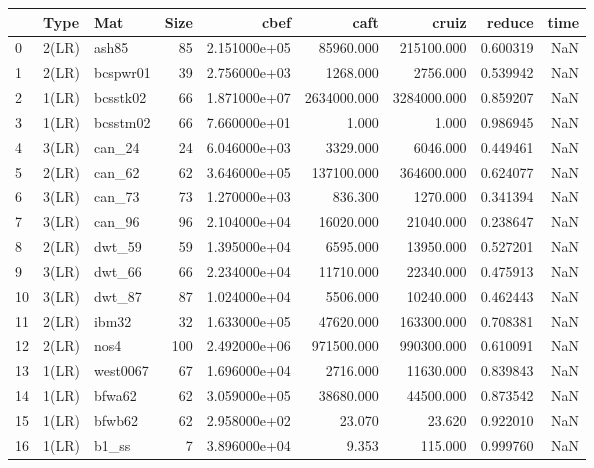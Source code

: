 \begin{tabular}{lllrrrrrr}
\toprule
{} &   Type &            Mat &  Size &          cbef &         caft &        cruiz &    reduce &  time \\
\midrule
0  &  2(LR) &          ash85 &    85 &  2.151000e+05 &    85960.000 &   215100.000 &  0.600319 &   NaN \\
1  &  2(LR) &       bcspwr01 &    39 &  2.756000e+03 &     1268.000 &     2756.000 &  0.539942 &   NaN \\
2  &  1(LR) &       bcsstk02 &    66 &  1.871000e+07 &  2634000.000 &  3284000.000 &  0.859207 &   NaN \\
3  &  1(LR) &       bcsstm02 &    66 &  7.660000e+01 &        1.000 &        1.000 &  0.986945 &   NaN \\
4  &  3(LR) &         can\_24 &    24 &  6.046000e+03 &     3329.000 &     6046.000 &  0.449461 &   NaN \\
5  &  2(LR) &         can\_62 &    62 &  3.646000e+05 &   137100.000 &   364600.000 &  0.624077 &   NaN \\
6  &  3(LR) &         can\_73 &    73 &  1.270000e+03 &      836.300 &     1270.000 &  0.341394 &   NaN \\
7  &  3(LR) &         can\_96 &    96 &  2.104000e+04 &    16020.000 &    21040.000 &  0.238647 &   NaN \\
8  &  2(LR) &         dwt\_59 &    59 &  1.395000e+04 &     6595.000 &    13950.000 &  0.527201 &   NaN \\
9  &  3(LR) &         dwt\_66 &    66 &  2.234000e+04 &    11710.000 &    22340.000 &  0.475913 &   NaN \\
10 &  3(LR) &         dwt\_87 &    87 &  1.024000e+04 &     5506.000 &    10240.000 &  0.462443 &   NaN \\
11 &  2(LR) &          ibm32 &    32 &  1.633000e+05 &    47620.000 &   163300.000 &  0.708381 &   NaN \\
12 &  2(LR) &           nos4 &   100 &  2.492000e+06 &   971500.000 &   990300.000 &  0.610091 &   NaN \\
13 &  1(LR) &       west0067 &    67 &  1.696000e+04 &     2716.000 &    11630.000 &  0.839843 &   NaN \\
14 &  1(LR) &         bfwa62 &    62 &  3.059000e+05 &    38680.000 &    44500.000 &  0.873542 &   NaN \\
15 &  1(LR) &         bfwb62 &    62 &  2.958000e+02 &       23.070 &       23.620 &  0.922010 &   NaN \\
16 &  1(LR) &          b1\_ss &     7 &  3.896000e+04 &        9.353 &      115.000 &  0.999760 &   NaN \\

\end{tabular}
